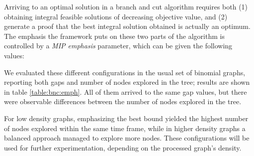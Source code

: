 Arriving to an optimal solution in a branch and cut algorithm requires both (1) obtaining integral feasible solutions of decreasing objective value, and (2) generate a proof that the best integral solution obtained is actually an optimum. The emphasis the framework puts on these two parts of the algorithm is controlled by a \textit{MIP emphasis} parameter, which can be given the following values:

\begin{itemize}
\end{itemize}

We evaluated these different configurations in the usual set of binomial graphs, reporting both gaps and number of nodes explored in the tree; results are shown in table \ref{table:bnc:emph}. All of them arrived to the same gap values, but there were observable differences between the number of nodes explored in the tree.

For low density graphs, emphasizing the best bound yielded the highest number of nodes explored within the same time frame, while in higher density graphs a balanced approach managed to explore more nodes. These configurations will be used for further experimentation, depending on the processed graph's density.

